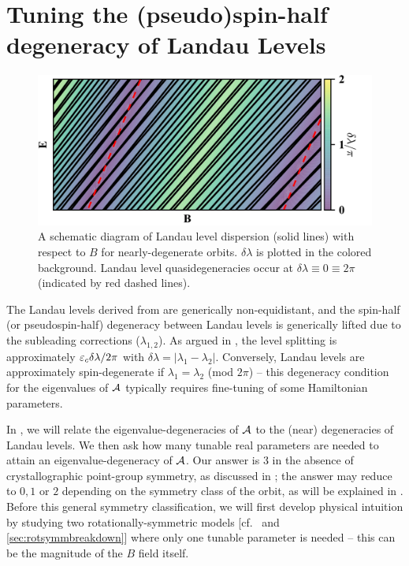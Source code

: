 \documentclass[aps, showpacs, twocolumn, notitlepage, superscriptaddress]{revtex4-1}
\begin{document}
\section{Tuning the (pseudo)spin-half degeneracy of Landau Levels}\label{sec:llquasideg}

\begin{figure}
\includegraphics[width=1.0\columnwidth]{LL.png}
\caption{A schematic diagram of Landau level dispersion (solid lines) with respect to $B$ for nearly-degenerate orbits. $\delta\lambda$ is plotted in the colored background. Landau level quasidegeneracies occur at $\delta\lambda\equiv 0\equiv 2\pi$ ({indicated by red dashed lines}).\label{fig:LL}}
\end{figure}

The Landau levels derived from  are generically non-equidistant, and the spin-half (or pseudospin-half) degeneracy between Landau levels is generically lifted due to the subleading corrections ($\lambda_{1,2}$). As argued in , the level splitting is approximately $\varepsilon_c\delta \lambda/2\pi$ with $\delta \lambda=|\lambda_1-\lambda_2|$. Conversely, Landau levels are approximately spin-degenerate if $\lambda_1{=}\lambda_2$ (mod $2\pi$) -- this degeneracy condition for the eigenvalues of ${\cal A}$ typically requires fine-tuning of some Hamiltonian parameters.  

In , we will relate the eigenvalue-degeneracies of  ${\cal A}$ to the (near) degeneracies of Landau levels. We then ask how many tunable real parameters are needed to attain an eigenvalue-degeneracy of ${\cal A}$. Our answer is  $3$ in the absence of crystallographic point-group symmetry, as discussed in ; the answer may reduce to $0,1$ or $2$ depending on the symmetry class of the orbit, as will be explained in . Before this general symmetry classification,  we will first develop physical intuition by studying two rotationally-symmetric models [cf.\  and \ref{sec:rotsymmbreakdown}] where only one tunable parameter is needed -- this can be the magnitude of the $B$ field itself.
\end{document}
